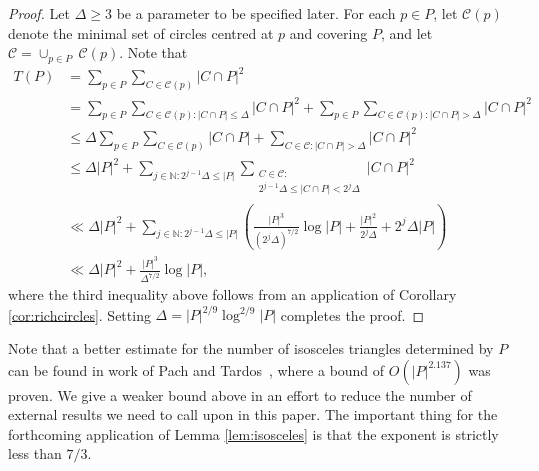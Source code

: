\documentclass[11pt,oneside]{amsart}
\numberwithin{exercise}{subsection}
\begin{document}
\begin{proof}
 Let $\Delta \geq 3$ be a parameter to be specified later. For each $p \in P$, let $\mathcal C(p)$ denote the minimal set of circles centred at $p$ and covering $P$, and let $\mathcal C= \cup_{p \in P} \ \mathcal{C}(p)$. Note that
\begin{align*}
T(P)&= \sum_{p \in P} \sum_{C \in \mathcal C(p)} |C \cap P|^2
\\&= \sum_{p \in P} \sum_{C \in \mathcal C(p): |C \cap P| \leq \Delta} |C \cap P|^2 +  \sum_{p \in P} \sum_{C \in \mathcal C(p): |C \cap P|>\Delta} |C \cap P|^2
\\&\leq \Delta \sum_{p \in P} \sum_{C \in \mathcal C(p)} |C \cap P| +   \sum_{C \in \mathcal C: |C \cap P|>\Delta} |C \cap P|^2
\\& \leq \Delta |P|^2 + \sum_{j \in \mathbb N : 2^{j-1}\Delta \leq |P|} \sum_{ \substack{C \in \mathcal C: \\ 2^{j-1}\Delta \leq |C \cap P|<2^j\Delta}} |C \cap P|^2
\\& \ll \Delta |P|^2 + \sum_{j \in \mathbb N : 2^{j-1}\Delta \leq |P|}  \left ( \frac{|P|^3}{(2^j\Delta)^{7/2}}\log|P| + \frac{|P|^2}{2^j\Delta}+ 2^j\Delta|P| \right )
\\ & \ll \Delta |P|^2 + \frac{|P|^3}{\Delta^{7/2}}\log|P|,
\end{align*}
where the third inequality above follows from an application of Corollary \ref{cor:richcircles}. Setting $\Delta= |P|^{2/9} \log^{2/9}|P|$ completes the proof.
\end{proof}

Note that a better estimate for the number of isosceles triangles determined by $P$ can be found in work of Pach and Tardos~\cite{PaTa02}, where a bound of $O(|P|^{2.137})$ was proven. We give a weaker bound above in an effort to reduce the number of external results we need to call upon in this paper. The important thing for the forthcoming application of Lemma \ref{lem:isosceles} is that the exponent is strictly less than $7/3$.
\end{document}
